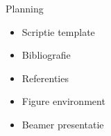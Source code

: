 \begin{frame}{Planning}
    \begin{itemize}[label = { \(\blacktriangleright \)}]
        \item Scriptie template \pause
        \item Bibliografie \pause
        \item Referenties \pause 
        \item Figure environment \pause 
        \item Beamer presentatie
    \end{itemize}
\end{frame}